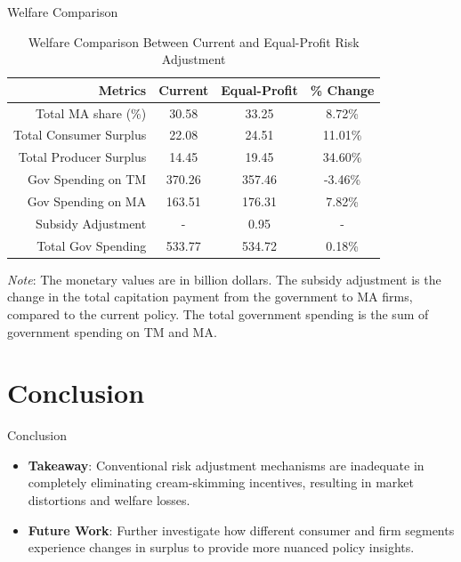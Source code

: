 \documentclass[professionalfonts, aspectratio=169]{beamer}
\begin{document}
\begin{frame}{Welfare Comparison}
  \begin{table}[ht]
    \small
    \centering
    \caption{Welfare Comparison Between Current and Equal-Profit Risk Adjustment}
    \label{tab:counterfactual}
    \begin{threeparttable}
      \renewcommand{\arraystretch}{1.2}
      \begin{tabular}{@{}rccc@{}}
        \toprule
        \textbf{Metrics} & \textbf{Current} & \textbf{Equal-Profit} & \textbf{\% Change} \\ \midrule
        Total MA share (\%) & 30.58 & 33.25 & 8.72\% \\
        Total Consumer Surplus & 22.08 & 24.51 & 11.01\% \\
        Total Producer Surplus & 14.45 & 19.45 & 34.60\% \\
        Gov Spending on TM & 370.26 & 357.46 & -3.46\% \\
        Gov Spending on MA & 163.51 & 176.31 & 7.82\% \\
        Subsidy Adjustment & - & 0.95 & - \\
        Total Gov Spending & 533.77 & 534.72 & 0.18\% \\
        \bottomrule
      \end{tabular}
      \begin{tablenotes}
        \footnotesize
        \textit{Note}: The monetary values are in billion dollars. The subsidy adjustment is the change in the total capitation payment from the government to MA firms, compared to the current policy. The total government spending is the sum of government spending on TM and MA.
      \end{tablenotes}
    \end{threeparttable}
  \end{table}
\end{frame}

\section{Conclusion}
\begin{frame}{Conclusion}
  \begin{itemize}
    \item \textbf{Takeaway}: Conventional risk adjustment mechanisms are inadequate in completely eliminating cream-skimming incentives, resulting in market distortions and welfare losses.
    \item \textbf{Future Work}: Further investigate how different consumer and firm segments experience changes in surplus to provide more nuanced policy insights.
  \end{itemize}
\end{frame}
\end{document}
